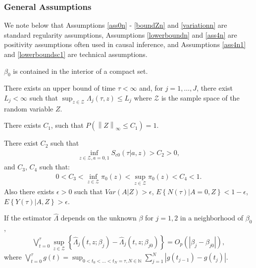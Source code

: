\documentclass[11pt]{article}
\newcommand{\norma}[1]{\left\lVert#1\right\rVert}
\newcommand{\eqnn}{\begin{eqnarray*}}
\newcommand{\een}{\end{eqnarray*}}
\begin{document}


\subsubsection{General Assumptions} %

We note below that Assumptions \ref{ass0n} - \ref{boundZn} and \ref{variationn} are standard regularity assumptions, Assumptions \ref{lowerboundn} and \ref{ass4n} are positivity assumptions often used in causal inference, and
Assumptions \ref{ass4n1} and \ref{lowerboundsc1} are  technical assumptions.

\begin{assumptionS}\label{ass0n} 
$\beta_0$ is contained in the interior of a compact set.
\end{assumptionS}

\begin{assumptionS}\label{boundln}
There exists an upper bound of time $\tau<\infty$ and, for $j=1,\ldots,J$, there exist $L_j<\infty$ such that $\sup_{z \in \mathcal{Z}}\Lambda_j(\tau, z)\leq L_j$ where $\mathcal{Z}$ is the sample space of the random variable $Z$.
\end{assumptionS}


\begin{assumptionS}\label{boundZn}
There exists $C_1$, such that 
$
P\left(\norma{Z}_{\infty}\leq C_1\right)=1.
$
\end{assumptionS}

\begin{assumptionS}\label{lowerboundn}
There exist  $C_2$ such that 
\eqnn \inf_{z \in \mathcal{Z}, a=0,1}S_{c0}(\tau | a,z)>C_2>0,\een
and $C_3$, $C_4$ such that:
\eqnn
0<C_3<\inf_{z \in \mathcal{Z}} \pi_0(z) <\sup_{z \in \mathcal{Z}} \pi_0(z)<C_4<1.
\een
Also there exists %
$\epsilon>0$ such that
$Var(A | Z)>\epsilon$, 
$E\left\{N(\tau) | A=0, Z\right\}<1-\epsilon$, 
$E\left\{Y(\tau) | A, Z\right\}>\epsilon$.
\end{assumptionS}

\begin{assumptionS}\label{variationn}
If the estimator $\hat \Lambda$ depends on the unknown $\beta$ for $j=1,2$ in a neighborhood of $\beta_0$, 
\eqnn
\bigvee_{t=0}^\tau\sup_{z \in \mathcal{Z}}\left\{\hat \Lambda_j(t,z ; \beta_j)-\hat \Lambda_j(t,z ; \beta_{j0})\right\}=O_p(\left|\beta_j-\beta_{j0}\right|),\nonumber
\een
where
$
\bigvee_{t=0}^\tau g(t)=\sup_{0<t_0<...<t_N=\tau, N \in \mathbb{N}}\sum_{j=1}^N \left|g(t_{j-1})-g(t_{j})\right|.
$
\end{assumptionS}
\end{document}
